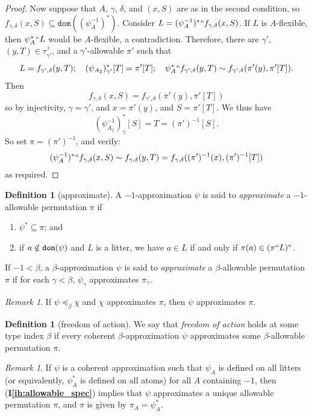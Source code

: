 \documentclass{article}
\theoremstyle{definition}
\newtheorem{definition}[theorem]{Definition}
\theoremstyle{remark}
\newtheorem{remark}[theorem]{Remark}
\newcommand{\ihref}[1]{(\textbf{I\ref{#1}})}
\begin{document}
{\begin{proof}
  Now suppose that $A$, $\gamma$, $\delta$, and $(x, S)$ are as in the second condition, so $f_{\gamma,\delta}(x,S) \subseteq \mathtt{dom}((\psi_A^{-1})^*)$.
  Consider $L = (\psi_A^{-1})^*``f_{\gamma,\delta}(x,S)$.
  If $L$ is $A$-flexible, then $\psi_A^*``L$ would be $A$-flexible, a contradiction.
  Therefore, there are $\gamma'$, $(y, T) \in \tau_{\gamma'}^+$, and a $\gamma'$-allowable $\pi'$ such that
  $$ L = f_{\gamma',\delta}(y,T);\quad (\psi_{A_2})^*_{\gamma'}[T] = \pi'[T];\quad \psi_A^*``f_{\gamma',\delta}(y,T) \sim f_{\gamma',\delta}(\pi'(y), \pi'[T]). $$
  Then
  $$ f_{\gamma,\delta}(x,S) = f_{\gamma',\delta}(\pi'(y), \pi'[T]) $$
  so by injectivity, $\gamma = \gamma'$, and $x = \pi'(y)$, and $S = \pi'[T]$.
  We thus have
  $$ (\psi_{A_2}^{-1})^*_\gamma[S] = T = (\pi')^{-1}[S]. $$
  So set $\pi = (\pi')^{-1}$, and verify:
  $$ (\psi_A^{-1})^* `` f_{\gamma,\delta}(x,S) \sim f_{\gamma,\delta}(y,T) = f_{\gamma,\delta}((\pi')^{-1}(x), (\pi')^{-1}[T]) $$
  as required.
\end{proof}
\begin{definition}[approximate]\label{def:approximates}
  A $-1$-approximation $\psi$ is said to {\em approximate\/} a $-1$-allowable permutation $\pi$ if
  \begin{enumerate}
    \item $\psi^* \subseteq \pi$; and
    \item if $a \notin {\tt dom}(\psi)$ and $L$ is a litter, we have $a \in L$ if and only if $\pi(a) \in (\pi``L)^\circ$.
  \end{enumerate}
  If $-1 < \beta$, a $\beta$-approximation $\psi$ is said to {\em approximate\/} a $\beta$-allowable permutation $\pi$ if for each $\gamma < \beta$, $\psi_\gamma$ approximates $\pi_\gamma$.
\end{definition}
\begin{remark}\label{rk:preceq_approximates}
  If $\psi \preceq_\beta \chi$ and $\chi$ approximates $\pi$, then $\psi$ approximates $\pi$.
\end{remark}
\begin{definition}[freedom of action]\label{def:foa}
  We say that {\em freedom of action\/} holds at some type index $\beta$ if every coherent $\beta$-approximation $\psi$ approximates some $\beta$-allowable permutation $\pi$.
\end{definition}
\begin{remark}\label{rk:foa_suffices}
  If $\psi$ is a coherent approximation such that $\psi_A$ is defined on all litters (or equivalently, $\psi_A^*$ is defined on all atoms) for all $A$ containing $-1$, then \ihref{ih:allowable_spec} implies that $\psi$ approximates a unique allowable permutation $\pi$, and $\pi$ is given by $\pi_A= \psi_A^*$.

\end{remark}}
\end{document}
